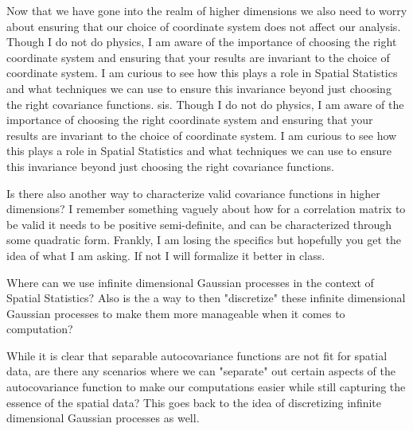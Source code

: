 \documentclass[answers,12pt,addpoints]{exam}
\begin{document}
\begin{questions}
\question Now that we have gone into the realm of higher dimensions we also need to worry about ensuring that our choice of coordinate system does not affect our analysis. Though I do not do physics, I am aware of the importance of choosing the right coordinate system and ensuring that your results are invariant to the choice of coordinate system. I am curious to see how this plays a role in Spatial Statistics and what techniques we can use to ensure this invariance beyond just choosing the right covariance functions.
sis. Though I do not do physics, I am aware of the importance of choosing the right coordinate system and ensuring that your results are invariant to the choice of coordinate system. I am curious to see how this plays a role in Spatial Statistics and what techniques we can use to ensure this invariance beyond just choosing the right covariance functions.

\question Is there also another way to characterize valid covariance functions in higher dimensions? I remember something vaguely about how for a correlation matrix to be valid it needs to be positive semi-definite, and can be characterized through some quadratic form. Frankly, I am losing the specifics but hopefully you get the idea of what I am asking. If not I will formalize it better in class.

\question  Where can we use infinite dimensional Gaussian processes in the context of Spatial Statistics? Also is the a way to then "discretize" these infinite dimensional Gaussian processes to make them more manageable when it comes to computation?

\question While it is clear that separable autocovariance functions are not fit for spatial data, are there any scenarios where we can "separate" out certain aspects of the autocovariance function to make our computations easier while still capturing the essence of the spatial data? This goes back to the idea of discretizing infinite dimensional Gaussian processes as well.


\end{questions}
\end{document}
